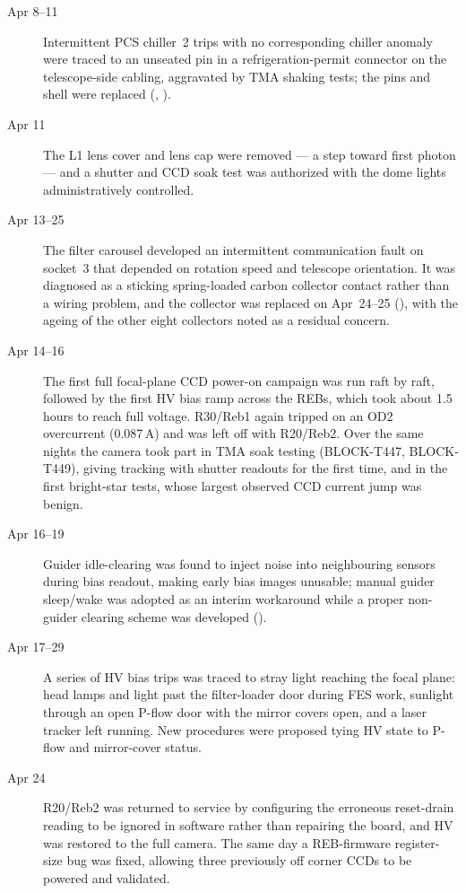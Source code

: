 \begin{description}
\item[Apr 8--11] Intermittent PCS chiller~2 trips with no
  corresponding chiller anomaly were traced to an unseated pin in a
  refrigeration-permit connector on the telescope-side cabling,
  aggravated by TMA shaking tests; the pins and shell were replaced
  (, ).

\item[Apr 11] The L1 lens cover and lens cap were removed --- a step
  toward first photon --- and a shutter and CCD soak test was
  authorized with the dome lights administratively controlled.

\item[Apr 13--25] The filter carousel developed an intermittent
  communication fault on socket~3 that depended on rotation speed and
  telescope orientation.  It was diagnosed as a sticking spring-loaded
  carbon collector contact rather than a wiring problem, and the
  collector was replaced on Apr~24--25 (), with the
  ageing of the other eight collectors noted as a residual concern.

\item[Apr 14--16] The first full focal-plane CCD power-on campaign was
  run raft by raft, followed by the first HV bias ramp across the
  REBs, which took about 1.5\,hours to reach full voltage.  R30/Reb1
  again tripped on an OD2 overcurrent (0.087\,A) and was left off with
  R20/Reb2.  Over the same nights the camera took part in TMA soak
  testing (BLOCK-T447, BLOCK-T449), giving tracking with shutter
  readouts for the first time, and in the first bright-star tests,
  whose largest observed CCD current jump was benign.

\item[Apr 16--19] Guider idle-clearing was found to inject noise into
  neighbouring sensors during bias readout, making early bias images
  unusable; manual guider sleep/wake was adopted as an interim
  workaround while a proper non-guider clearing scheme was developed
  ().

\item[Apr 17--29] A series of HV bias trips was traced to stray light
  reaching the focal plane: head lamps and light past the filter-loader
  door during FES work, sunlight through an open P-flow door with the
  mirror covers open, and a laser tracker left running.  New
  procedures were proposed tying HV state to P-flow and mirror-cover
  status.

\item[Apr 24] R20/Reb2 was returned to service by configuring the
  erroneous reset-drain reading to be ignored in software rather than
  repairing the board, and HV was restored to the full camera.  The
  same day a REB-firmware register-size bug was fixed, allowing three
  previously off corner CCDs to be powered and validated.


\end{description}
